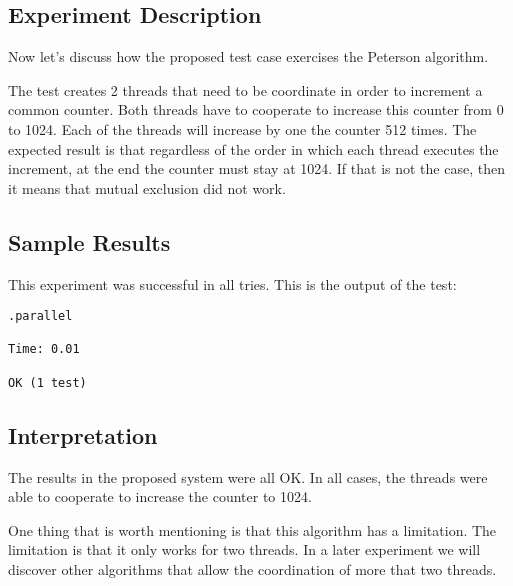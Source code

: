 \subsection{Experiment Description}
\par
 Now let's discuss how the proposed test case exercises the Peterson algorithm. 
 \par
 The test creates 2 threads that need to be coordinate in order to increment a
common counter. Both threads have to cooperate to increase this counter from 0
to 1024. Each of the threads will increase by one the counter 512 times. The
expected result is that regardless of the order in which each thread executes
the increment, at the end the counter must stay at 1024. If that is not the
case, then it means that mutual exclusion did not work.
\par
\subsection{Sample Results}
\par
This experiment was successful in all tries. This is the output of the test:
\par
\begin{verbatim}
.parallel

Time: 0.01

OK (1 test)
\end{verbatim}
\hfill
\subsection{Interpretation}
\par
The results in the proposed system were all OK. In all cases, the threads were
able to cooperate to increase the counter to 1024.
\par
One thing that is worth mentioning is that this algorithm has a limitation. The
limitation is that it only works for two threads. In a later experiment we will
discover other algorithms that allow the coordination of more that two threads.
